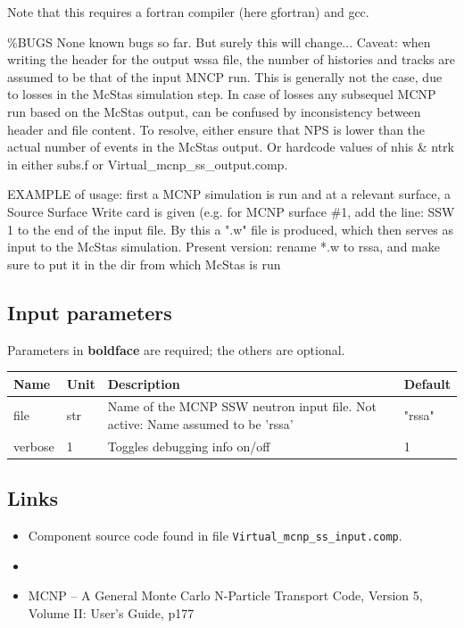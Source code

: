 Note that this requires a fortran compiler (here gfortran) and gcc.

\%BUGS None known bugs so far. But surely this will change... Caveat: when writing the header for the output wssa file, the number of histories and tracks are assumed to be that of the input MNCP run. This is generally not the case, due to losses in the McStas simulation step. In case of losses any subsequel MCNP run based on the McStas output, can be confused by inconsistency between header and file content. To resolve, either ensure that NPS is lower than the actual number of events in the McStas output. Or hardcode values of nhis \& ntrk in either subs.f or Virtual\_mcnp\_ss\_output.comp.

EXAMPLE of usage: first a MCNP simulation is run and at a relevant surface, a Source Surface Write card is given (e.g. for MCNP surface \#1, add the line: SSW 1 to the end of the input file. By this a ".w" file is produced, which then serves as input to the McStas simulation. Present version: rename *.w to rssa, and make sure to put it in the dir from which McStas is run

\subsection*{Input parameters}
Parameters in \textbf{boldface} are required; the others are optional.

\begin{longtable}{p{}p{}p{}p{}}
\toprule
\textbf{Name} & \textbf{Unit} & \textbf{Description} & \textbf{Default} \\
\midrule
\endhead
file & str & Name of the MCNP SSW neutron input file. Not active: Name assumed to be 'rssa' & "rssa" \\
verbose & 1 & Toggles debugging info on/off & 1 \\
\bottomrule
\end{longtable}

\subsection*{Links}
\begin{itemize}
  \item Component source code found in file \texttt{Virtual\_mcnp\_ss\_input.comp}.
  \item {}
  \item MCNP -- A General Monte Carlo N-Particle Transport Code, Version 5, Volume II: User's Guide, p177
\end{itemize}

